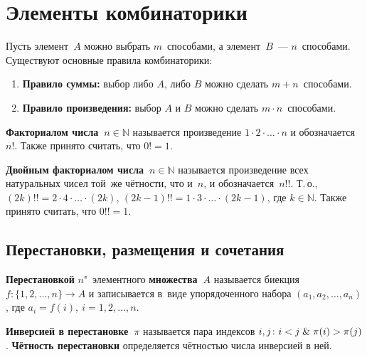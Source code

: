 \section{Элементы комбинаторики}
Пусть элемент~$A$ можно выбрать $m$~способами, а элемент~$B$~--- $n$~способами. Существуют основные правила комбинаторики:
\begin{enumerate}
	\item \textbf{Правило суммы:} выбор либо $A$, либо $B$ можно сделать $m + n$~способами.
	\item \textbf{Правило произведения:} выбор $A$ и $B$ можно сделать $m \cdot n$~способами.
\end{enumerate}

\index{!}  \textbf{Факториалом числа~$n \in \mathbb N$} называется произведение $1 \cdot 2 \cdot \ldots \cdot n$ и обозначается~$n!$.
Также принято считать, что $0! = 1$.

\textbf{Двойным факториалом числа~$n \in \mathbb N$} называется произведение всех натуральных чисел той~же чётности, что и~$n$, и обозначается~$n!!$.
Т.\,о., $(2k)!! = 2 \cdot 4 \cdot \ldots \cdot (2k)$, $(2k - 1)!! = 1 \cdot 3 \cdot \ldots \cdot (2k - 1)$, где $k \in \mathbb N$.
Также принято считать, что $0!! = 1$.

\subsection{Перестановки, размещения и сочетания}
 \textbf{Перестановкой} $n$"~элементного \textbf{множества~$A$} называется биекция $f \colon \{ 1, 2, \ldots, n \} \to A$ и записывается в~виде упорядоченного набора $(a_1, a_2, \ldots, a_n)$, где $a_i = f(i), \ i = 1, 2, \ldots, n$.

 \textbf{Инверсией в перестановке~$\pi$} называется пара индексов $i, j \colon i < j \mathrel{\&} \pi(i) > \pi(j)$.
\textbf{Чётность перестановки} определяется чётностью числа инверсией в ней.


